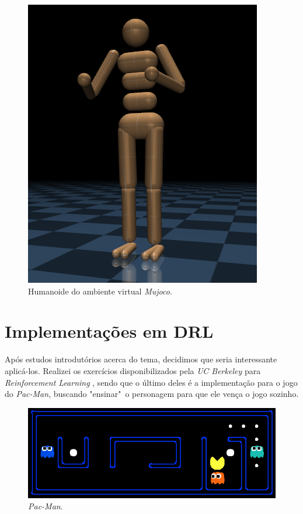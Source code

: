 \documentclass{article}
\begin{document}
        \begin{figure}[h!]
            \centering
            \includegraphics[scale=0.8]{humanoid.png}
            \caption{Humanoide do ambiente virtual \textit{Mujoco}.}
        \end{figure}

    \section{Implementações em DRL}

        Após estudos introdutórios acerca do tema, decidimos
        que seria interessante aplicá-los. Realizei os exercícios
        disponibilizados pela \textit{UC Berkeley} para \textit{Reinforcement
        Learning}
        , sendo que o último deles é a implementação para o jogo
        do \textit{Pac-Man}, buscando "ensinar"\ o personagem para que
        ele vença o jogo sozinho.

        \begin{figure}[h!]
            \centering
            \includegraphics[width=\textwidth]{pac_man.png}
            \caption{\textit{Pac-Man}.}
        \end{figure}
\end{document}
